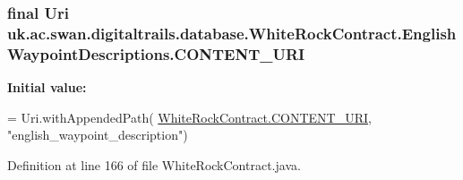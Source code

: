 \hypertarget{classuk_1_1ac_1_1swan_1_1digitaltrails_1_1database_1_1_white_rock_contract_1_1_english_waypoint_descriptions_a4ed68a49659b074ba15056a0e4b740ca}{
\subsubsection[{C\+O\+N\+T\+E\+N\+T\+\_\+\+U\+R\+I}]{\setlength{\rightskip}{0pt plus 5cm}final Uri uk.\+ac.\+swan.\+digitaltrails.\+database.\+White\+Rock\+Contract.\+English\+Waypoint\+Descriptions.\+C\+O\+N\+T\+E\+N\+T\+\_\+\+U\+R\+I\hspace{0.3cm}{\ttfamily [static]}}}\label{classuk_1_1ac_1_1swan_1_1digitaltrails_1_1database_1_1_white_rock_contract_1_1_english_waypoint_descriptions_a4ed68a49659b074ba15056a0e4b740ca}
{\bfseries Initial value\+:}
\begin{DoxyCode}
= Uri.withAppendedPath(
                \hyperlink{classuk_1_1ac_1_1swan_1_1digitaltrails_1_1database_1_1_white_rock_contract_abfe96759bfe16773a98099536eef2306}{WhiteRockContract.CONTENT\_URI}, \textcolor{stringliteral}{"english\_waypoint\_description"})
\end{DoxyCode}


Definition at line 166 of file White\+Rock\+Contract.\+java.

